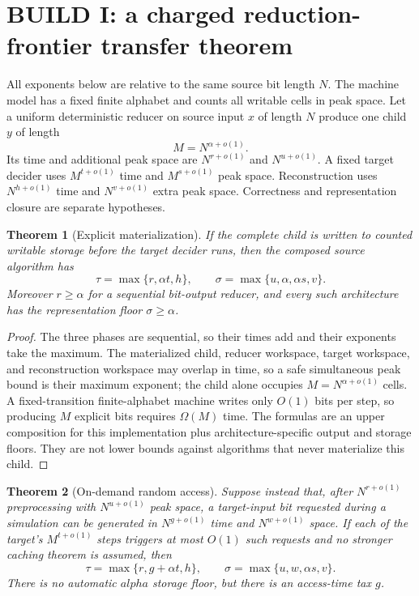 \documentclass[11pt]{article}
\newtheorem{theorem}{Theorem}
\begin{document}
\section{BUILD I: a charged reduction-frontier transfer theorem}

All exponents below are relative to the same source bit length $N$.  The machine model has a fixed
finite alphabet and counts all writable cells in peak space.  Let a uniform deterministic reducer on
source input $x$ of length $N$ produce one child $y$ of length
\[
 M=N^{\alpha+o(1)}.
\]
Its time and additional peak space are $N^{r+o(1)}$ and $N^{u+o(1)}$.  A fixed target decider uses
$M^{t+o(1)}$ time and $M^{s+o(1)}$ peak space.  Reconstruction uses $N^{h+o(1)}$ time and
$N^{v+o(1)}$ extra peak space.  Correctness and representation closure are separate hypotheses.

\begin{theorem}[Explicit materialization]
\label{thm:materialized}
If the complete child is written to counted writable storage before the target decider runs, then the
composed source algorithm has
\[
 \tau=\max\{r,\alpha t,h\},\qquad
 \sigma=\max\{u,\alpha,\alpha s,v\}.
\]
Moreover $r\geq\alpha$ for a sequential bit-output reducer, and every such architecture has the
representation floor $\sigma\geq\alpha$.
\end{theorem}

\begin{proof}
The three phases are sequential, so their times add and their exponents take the maximum.  The
materialized child, reducer workspace, target workspace, and reconstruction workspace may overlap in
time, so a safe simultaneous peak bound is their maximum exponent; the child alone occupies
$M=N^{\alpha+o(1)}$ cells.  A fixed-transition finite-alphabet machine writes only $O(1)$ bits per
step, so producing $M$ explicit bits requires $\Omega(M)$ time.  The formulas are an upper
composition for this implementation plus architecture-specific output and storage floors.  They are
not lower bounds against algorithms that never materialize this child.
\end{proof}

\begin{theorem}[On-demand random access]
\label{thm:ondemand}
Suppose instead that, after $N^{r+o(1)}$ preprocessing with $N^{u+o(1)}$ peak space, a target-input
bit requested during a simulation can be generated in $N^{g+o(1)}$ time and $N^{w+o(1)}$ space.
If each of the target's $M^{t+o(1)}$ steps triggers at most $O(1)$ such requests and no stronger
caching theorem is assumed, then
\[
 \tau=\max\{r,g+\alpha t,h\},\qquad
 \sigma=\max\{u,w,\alpha s,v\}.
\]
There is no automatic $alpha$ storage floor, but there is an access-time tax $g$.
\end{theorem}
\end{document}
